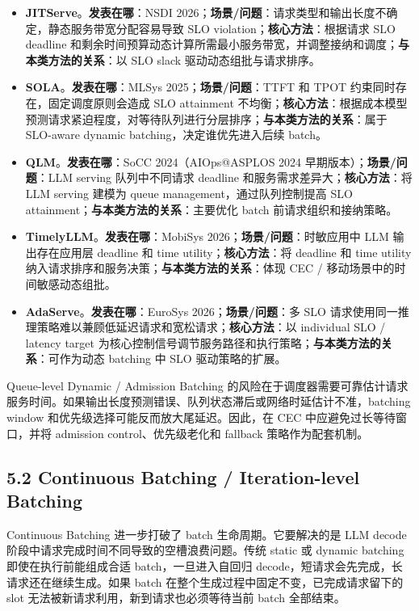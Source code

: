\documentclass[a4paper,twocolumn,10pt]{ctexart}
\begin{document}
\begin{itemize}
\item \textbf{JITServe}。\textbf{发表在哪}：NSDI 2026；\textbf{场景/问题}：请求类型和输出长度不确定，静态服务带宽分配容易导致 SLO violation；\textbf{核心方法}：根据请求 SLO deadline 和剩余时间预算动态计算所需最小服务带宽，并调整接纳和调度；\textbf{与本类方法的关系}：以 SLO slack 驱动动态组批与请求排序。
\item \textbf{SOLA}。\textbf{发表在哪}：MLSys 2025；\textbf{场景/问题}：TTFT 和 TPOT 约束同时存在，固定调度原则会造成 SLO attainment 不均衡；\textbf{核心方法}：根据成本模型预测请求紧迫程度，对等待队列进行分层排序；\textbf{与本类方法的关系}：属于 SLO-aware dynamic batching，决定谁优先进入后续 batch。
\item \textbf{QLM}。\textbf{发表在哪}：SoCC 2024（AIOps@ASPLOS 2024 早期版本）；\textbf{场景/问题}：LLM serving 队列中不同请求 deadline 和服务需求差异大；\textbf{核心方法}：将 LLM serving 建模为 queue management，通过队列控制提高 SLO attainment；\textbf{与本类方法的关系}：主要优化 batch 前请求组织和接纳策略。
\item \textbf{TimelyLLM}。\textbf{发表在哪}：MobiSys 2026；\textbf{场景/问题}：时敏应用中 LLM 输出存在应用层 deadline 和 time utility；\textbf{核心方法}：将 deadline 和 time utility 纳入请求排序和服务决策；\textbf{与本类方法的关系}：体现 CEC / 移动场景中的时间敏感动态组批。
\item \textbf{AdaServe}。\textbf{发表在哪}：EuroSys 2026；\textbf{场景/问题}：多 SLO 请求使用同一推理策略难以兼顾低延迟请求和宽松请求；\textbf{核心方法}：以 individual SLO / latency target 为核心控制信号调节服务路径和执行策略；\textbf{与本类方法的关系}：可作为动态 batching 中 SLO 驱动策略的扩展。
\end{itemize}





Queue-level Dynamic / Admission Batching 的风险在于调度器需要可靠估计请求服务时间。如果输出长度预测错误、队列状态滞后或网络时延估计不准，batching window 和优先级选择可能反而放大尾延迟。因此，在 CEC 中应避免过长等待窗口，并将 admission control、优先级老化和 fallback 策略作为配套机制。


\subsection{5.2 Continuous Batching / Iteration-level Batching}

Continuous Batching 进一步打破了 batch 生命周期。它要解决的是 LLM decode 阶段中请求完成时间不同导致的空槽浪费问题。传统 static 或 dynamic batching 即使在执行前能组成合适 batch，一旦进入自回归 decode，短请求会先完成，长请求还在继续生成。如果 batch 在整个生成过程中固定不变，已完成请求留下的 slot 无法被新请求利用，新到请求也必须等待当前 batch 全部结束。
\end{document}
